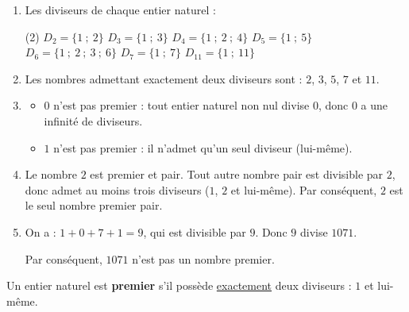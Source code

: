 \documentclass[10pt, a4paper]{article}
\begin{document}
\begin{Solution}[ACTIVITÉ][2]

\begin{enumerate}[leftmargin=*,itemsep=0.5pt]
    \item Les diviseurs de chaque entier naturel :
 \begin{tasks}[label=$\bullet$, label-width=12pt, item-indent=15pt](2)
    \task $D_2 = \big\{1 ~;~ 2\big\}$
    \task $D_3 = \big\{1 ~;~ 3\big\}$
    \task $D_4 = \big\{1 ~;~ 2 ~;~ 4\big\}$
    \task $D_5 = \big\{1 ~;~ 5\big\}$
    \task $D_6 = \big\{1 ~;~ 2 ~;~  3 ~;~ 6\big\}$
    \task $D_7 = \big\{1 ~;~ 7\big\}$
    \task $D_{11} = \big\{1 ~;~ 11\big\}$
\end{tasks}


    \item Les nombres admettant exactement deux diviseurs sont : $2$, $3$, $5$, $7$ et $11$.
    
    \item \begin{itemize}[leftmargin=*,itemsep=0.5pt]
    \item $0$ n'est pas premier : tout entier naturel non nul divise $0$, donc $0$ a une infinité de diviseurs.
    \item $1$ n'est pas premier : il n'admet qu'un seul diviseur (lui-même).
\end{itemize}
    
    \item Le nombre $2$ est premier et pair. Tout autre nombre pair est divisible par $2$, donc admet au moins trois diviseurs ($1$, $2$ et lui-même). Par conséquent, $2$ est le seul nombre premier pair.
    
    \item On a : $1 + 0 + 7 + 1 = 9$, qui est divisible par $9$. Donc $9$ divise $1071$.

Par conséquent, $1071$ n'est pas un nombre premier.
\end{enumerate}

\end{Solution}

\begin{Definition}[]
Un entier naturel est \textbf{premier} s'il possède \underline{exactement} deux diviseurs : $1$ et lui-même.
\end{Definition}

\end{document}
